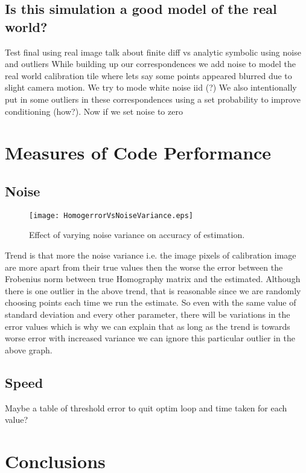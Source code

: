 \documentclass[titlepage]{article}
\begin{document}
\subsection{Is this simulation a good model of the real world?}

Test final using real image
talk about finite diff vs analytic symbolic
using noise and outliers
While building up our correspondences we add noise to model the real world calibration tile where lets say some points appeared blurred due to slight camera motion. We try to mode white noise iid (?)
We also intentionally put in some outliers in these correspondences using a set probability to improve conditioning (how?).
Now if we set noise to zero 

\section{Measures of Code Performance}
\subsection{Noise}
\begin{wrapfigure}{R}{5.5cm}
\caption{Effect of varying noise variance on accuracy of estimation.}\label{wrap-fig:1}
\texttt{[image: HomogerrorVsNoiseVariance.eps]}
\end{wrapfigure} 
Trend is that more the noise variance i.e. the image pixels of calibration image are more apart from their true values then the worse the error between the Frobenius norm between true Homography matrix and the estimated. Although there is one outlier in the above trend, that is reasonable since we are randomly choosing points each time we run the estimate. So even with the same value of standard deviation and every other parameter, there will be variations in the error values which is why we can explain that as long as the trend is towards worse error with increased variance we can ignore this particular outlier in the above graph.

\subsection{Speed}
Maybe a table of threshold error to quit optim loop and time taken for each value?



\section{Conclusions}
\end{document}
